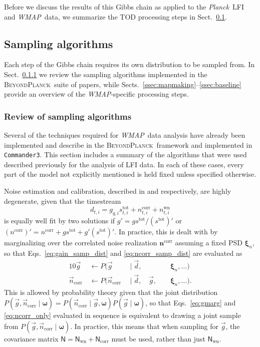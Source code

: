 \documentclass[twocolumn]{../../common/aa}
\def\WMAP{\emph{WMAP}}
\def\Planck{\emph{Planck}}
\def\commanderthree{\texttt{Commander3}}
\renewcommand{\d}[0]{\vec{d}}
\newcommand{\g}[0]{\vec{g}}
\newcommand{\bp}{\textsc{BeyondPlanck}}
\newcommand{\ncorr}{\vec n_\mathrm{corr}}
\begin{document}
Before we discuss the results of this Gibbs chain as applied to the \Planck\ LFI and \WMAP\ data, we summarize the TOD processing steps in Sect.~\ref{sec:algorithms}.



\subsection{Sampling algorithms}
\label{sec:algorithms}

Each step of the Gibbs chain requires its own distribution to be sampled from. In Sect.~\ref{ssec:oldsamplers} we review the sampling algorithms implemented in the \bp\ suite of papers, while Sects.~\ref{ssec:mapmaking}--\ref{ssec:baseline} provide an overview of the \WMAP-specific processing steps.

\subsubsection{Review of sampling algorithms}
\label{ssec:oldsamplers}


Several of the techniques required for \WMAP\ data analysis have already been implemented and describe in the \bp\ framework and implemented in \commanderthree. This section includes a summary of the algorithms that were used described previously for the analysis of LFI data. In each of these cases, every part of the model not explicitly mentioned is held fixed unless specified otherwise.

Noise estimation and calibration, described in \citet{bp06} and \citet{bp07} respectively, are highly degenerate, given that the timestream
\begin{equation}
	d_{t,i}=g_{q,i}s_{t,i}^\mathrm{tot}+n_{t,i}^\mathrm{corr}+n_{t,i}^\mathrm{wn}
\end{equation}
is equally well fit by two solutions if $g'=gs^\mathrm{tot}/(s^\mathrm{tot})'$ or ${(n^\mathrm{corr})'=n^\mathrm{corr}+gs^\mathrm{tot}+g'(s^\mathrm{tot})'}$. In practice, this is dealt with by marginalizing over the correlated noise realization $\boldsymbol n^\mathrm{corr}$ assuming a fixed PSD $\boldsymbol\xi_n$, so that Eqs.~\eqref{eq:gain_samp_dist} and \eqref{eq:ncorr_samp_dist} are evaluated as
\begin{alignat}{10}
	\g&\,\leftarrow P(\g&\,\mid\d, &\, &\,&\,\boldsymbol\xi_n,\ldots)
	\label{eq:gmarg}
	\\
	\ncorr&\,\leftarrow P(\ncorr&\,\mid\d, &\,\g, &\,&\,\boldsymbol\xi_n,\ldots).
	\label{eq:ncorr_only}
\end{alignat}
This is allowed by probability theory given that the joint distribution $P(\g,\ncorr\mid\boldsymbol\omega)=P(\ncorr\mid\g,\boldsymbol\omega)P(\g\mid\boldsymbol\omega)$, so that Eqs.~\eqref{eq:gmarg} and \eqref{eq:ncorr_only} evaluated in sequence is equivalent to drawing a joint sample from $P(\g,\ncorr\mid\boldsymbol\omega)$. In practice, this means that when sampling for $\g$, the covariance matrix $\mathsf N=\mathsf N_\textrm{wn}+\mathsf N_\textrm{corr}$ must be used, rather than just $\mathsf N_\mathrm{wn}$.
\end{document}
